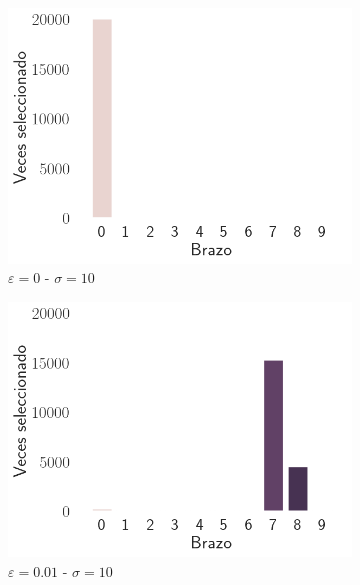 \documentclass[12pt]{article}
\begin{document}
\begin{figure}[h]
        \begin{subfigure}[H]{0.3\textwidth}
            \includegraphics[width=\textwidth]{../img/arm_sigma_10_epsilon_0}
            \caption{$\varepsilon=0$ - $\sigma=10$}
            \label{fig:arms_selected_10_0}
        \end{subfigure}
        \begin{subfigure}[H]{0.3\textwidth}
            \includegraphics[width=\textwidth]{../img/arm_sigma_10_epsilon_0.01}
            \caption{$\varepsilon=0.01$ - $\sigma=10$}
            \label{fig:arms_selected_10_0.01}
        \end{subfigure}
        \begin{subfigure}[H]{0.3\textwidth}

\end{subfigure}
\end{figure}
\end{document}
